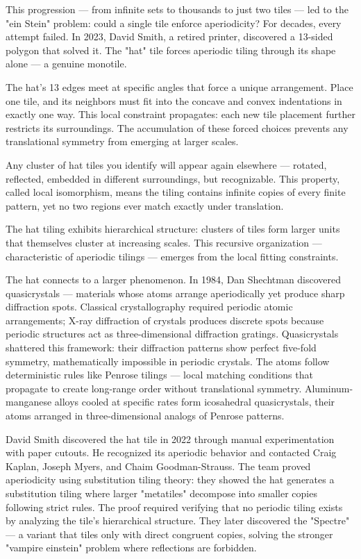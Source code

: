 This progression — from infinite sets to thousands to just two tiles — led to the "ein Stein" problem: could a single tile enforce aperiodicity? For decades, every attempt failed. In 2023, David Smith, a retired printer, discovered a 13-sided polygon that solved it. The "hat" tile forces aperiodic tiling through its shape alone — a genuine monotile.

The hat's 13 edges meet at specific angles that force a unique arrangement. Place one tile, and its neighbors must fit into the concave and convex indentations in exactly one way. This local constraint propagates: each new tile placement further restricts its surroundings. The accumulation of these forced choices prevents any translational symmetry from emerging at larger scales.

Any cluster of hat tiles you identify will appear again elsewhere — rotated, reflected, embedded in different surroundings, but recognizable. This property, called local isomorphism, means the tiling contains infinite copies of every finite pattern, yet no two regions ever match exactly under translation.

The hat tiling exhibits hierarchical structure: clusters of tiles form larger units that themselves cluster at increasing scales. This recursive organization — characteristic of aperiodic tilings — emerges from the local fitting constraints.

The hat connects to a larger phenomenon. In 1984, Dan Shechtman discovered quasicrystals — materials whose atoms arrange aperiodically yet produce sharp diffraction spots. Classical crystallography required periodic atomic arrangements; X-ray diffraction of crystals produces discrete spots because periodic structures act as three-dimensional diffraction gratings. Quasicrystals shattered this framework: their diffraction patterns show perfect five-fold symmetry, mathematically impossible in periodic crystals. The atoms follow deterministic rules like Penrose tilings — local matching conditions that propagate to create long-range order without translational symmetry. Aluminum-manganese alloys cooled at specific rates form icosahedral quasicrystals, their atoms arranged in three-dimensional analogs of Penrose patterns.

David Smith discovered the hat tile in 2022 through manual experimentation with paper cutouts. He recognized its aperiodic behavior and contacted Craig Kaplan, Joseph Myers, and Chaim Goodman-Strauss. The team proved aperiodicity using substitution tiling theory: they showed the hat generates a substitution tiling where larger "metatiles" decompose into smaller copies following strict rules. The proof required verifying that no periodic tiling exists by analyzing the tile's hierarchical structure. They later discovered the "Spectre" — a variant that tiles only with direct congruent copies, solving the stronger "vampire einstein" problem where reflections are forbidden.

